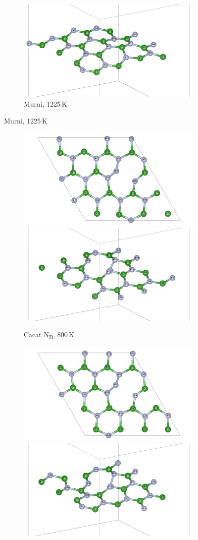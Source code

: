 \begin{figure}[htbp]
\begin{subfigure}{\textwidth}
    \includegraphics[width=0.49\linewidth]{gambar_hasil/hBN_pure_side_1225K.png}
    \caption{Murni, 1225 K}
    \label{subfig:md_pure_1225k}
  \end{subfigure}
\end{figure}

\begin{figure}[htbp]\ContinuedFloat
  \centering
  \begin{subfigure}{\textwidth}
    \centering
    \includegraphics[width=0.49\linewidth]{gambar_hasil/hBN_NN_800K.png}\hfill
    \includegraphics[width=0.49\linewidth]{gambar_hasil/hBN_NN_side_800K.png}
    \caption{Cacat N\textsubscript{B}, 800 K}
    \label{subfig:md_nn_800k}
  \end{subfigure}
  \vspace{1em}
  \begin{subfigure}{\textwidth}
    \centering
    \includegraphics[width=0.49\linewidth]{gambar_hasil/hBN_NN_1100K.png}\hfill
    \includegraphics[width=0.49\linewidth]{gambar_hasil/hBN_NN_side_1100K.png}

\end{subfigure}
\end{figure}
